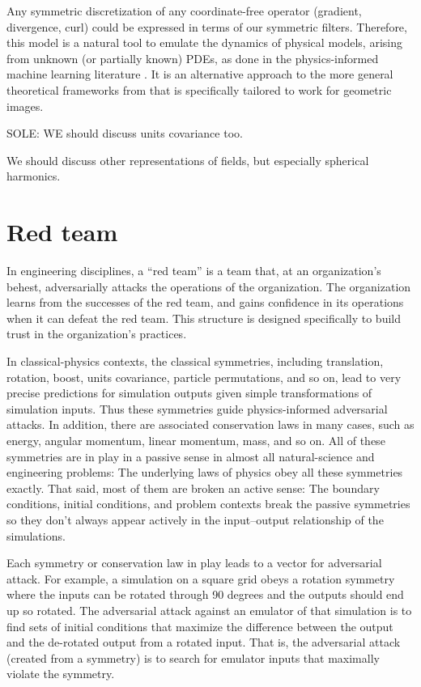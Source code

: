 \documentclass[11pt]{article}
\begin{document}
Any symmetric discretization of any coordinate-free operator (gradient, divergence, curl) could be expressed in terms of our symmetric filters. Therefore, this model is a natural tool to emulate the dynamics of physical models, arising from unknown (or partially known) PDEs, as done in the physics-informed machine learning literature \cite{karniadakis2021physics, hao2022physics}. It is an alternative approach to the more general theoretical frameworks from \cite{steerable, jenner2021steerable, bhardwaj2023steerable, clifford} that is specifically tailored to work for geometric images.   

SOLE: WE should discuss units covariance too.

We should discuss other representations of fields, but especially spherical harmonics.

\section{Red team}

In engineering disciplines, a ``red team'' is a team that, at an organization's behest, adversarially attacks the operations of the organization.
The organization learns from the successes of the red team, and gains confidence in its operations when it can defeat the red team.
This structure is designed specifically to build trust in the organization's practices.

In classical-physics contexts, the classical symmetries, including translation, rotation, boost, units covariance, particle permutations, and so on, lead to very precise predictions for simulation outputs given simple transformations of simulation inputs.
Thus these symmetries guide physics-informed adversarial attacks.
In addition, there are associated conservation laws in many cases, such as energy, angular momentum, linear momentum, mass, and so on.
All of these symmetries are in play in a passive sense in almost all natural-science and engineering problems: The underlying laws of physics obey all these symmetries exactly.
That said, most of them are broken an active sense: The boundary conditions, initial conditions, and problem contexts break the passive symmetries so they don't always appear actively in the input--output relationship of the simulations.

Each symmetry or conservation law in play leads to a vector for adversarial attack.
For example, a simulation on a square grid obeys a rotation symmetry where the inputs can be rotated through 90 degrees and the outputs should end up so rotated.
The adversarial attack against an emulator of that simulation is to find sets of initial conditions that maximize the difference between the output and the de-rotated output from a rotated input.
That is, the adversarial attack (created from a symmetry) is to search for emulator inputs that maximally violate the symmetry.
\end{document}
